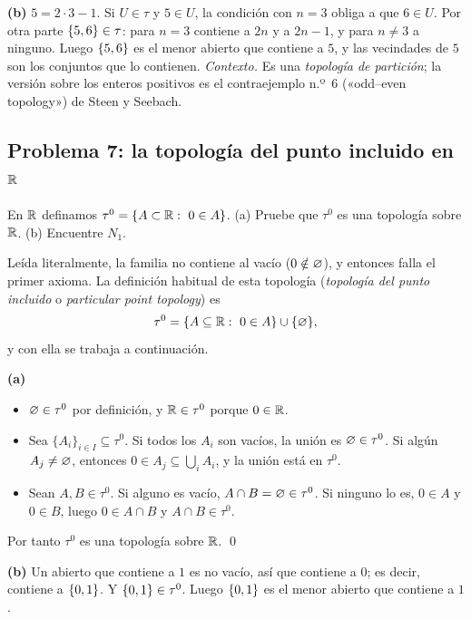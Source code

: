 \textbf{(b)} $5=2\cdot3-1$. Si $U\in\tau$ y $5\in U$, la condición con $n=3$ obliga a que $6\in U$. Por otra parte
$\{5,6\}\in\tau$: para $n=3$ contiene a $2n$ y a $2n-1$, y para $n\neq3$ a ninguno. Luego $\{5,6\}$ es el menor
abierto que contiene a $5$, y las vecindades de $5$ son los conjuntos que lo contienen.
\emph{Contexto.} Es una \emph{topología de partición}; la versión sobre los enteros positivos es el contraejemplo n.º~6
(«odd--even topology») de Steen y Seebach.

\subsection{Problema 7: la topología del punto incluido en \texorpdfstring{$\mathbb{R}$}{R}}
\begin{enunciado}
En $\mathbb{R}$ definamos $\tau^0=\{A\subset\mathbb{R}:\ 0\in A\}$. (a) Pruebe que $\tau^0$ es una topología sobre $\mathbb{R}$.
(b) Encuentre $N_1$.
\end{enunciado}
\begin{ojo}[Supuesto S4]
Leída literalmente, la familia no contiene al vacío ($0\notin\varnothing$), y entonces falla el primer axioma. La
definición habitual de esta topología (\emph{topología del punto incluido} o \emph{particular point topology}) es
\[\tau^0=\{A\subseteq\mathbb{R}:\ 0\in A\}\cup\{\varnothing\},\]
y con ella se trabaja a continuación.
\end{ojo}
\textbf{(a)}
\begin{itemize}
\item[(T1)] $\varnothing\in\tau^0$ por definición, y $\mathbb{R}\in\tau^0$ porque $0\in\mathbb{R}$.
\item[(T2)] Sea $\{A_i\}_{i\in I}\subseteq\tau^0$. Si todos los $A_i$ son vacíos, la unión es $\varnothing\in\tau^0$. Si algún
$A_j\neq\varnothing$, entonces $0\in A_j\subseteq\bigcup_i A_i$, y la unión está en $\tau^0$.
\item[(T3)] Sean $A,B\in\tau^0$. Si alguno es vacío, $A\cap B=\varnothing\in\tau^0$. Si ninguno lo es, $0\in A$ y $0\in B$,
luego $0\in A\cap B$ y $A\cap B\in\tau^0$.
\end{itemize}
Por tanto $\tau^0$ es una topología sobre $\mathbb{R}$. \qed

\textbf{(b)} Un abierto que contiene a $1$ es no vacío, así que contiene a $0$; es decir, contiene a $\{0,1\}$. Y
$\{0,1\}\in\tau^0$. Luego $\{0,1\}$ es el menor abierto que contiene a $1$.


